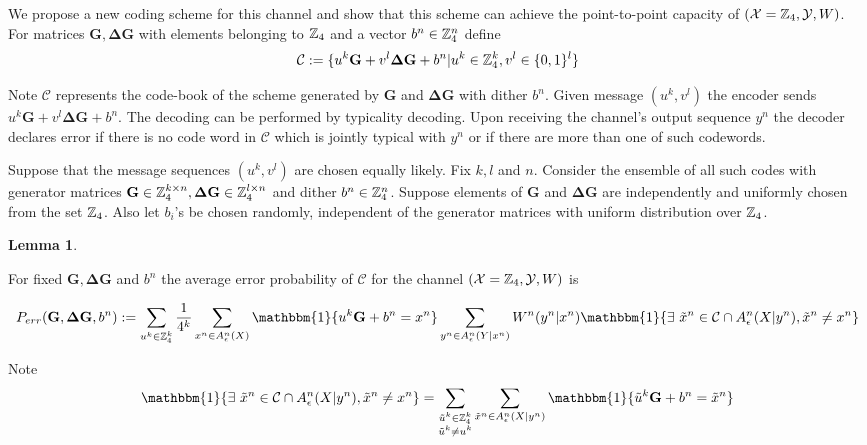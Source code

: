 \documentclass[11pt]{article}
\theoremstyle{plain}
\newtheorem{lem}{Lemma}
\theoremstyle{definition}
\theoremstyle{remark}
\begin{document}
We propose a new coding scheme for this channel and show that this scheme can achieve the point-to-point capacity of $(\mathcal{X}=\mathbb{Z}_4,\mathcal{Y}, W)$. 
For matrices $\mathbf{G}, \mathbf{\Delta G}$ with elements belonging to $\mathbb{Z}_4$ and a vector $b^n\in \mathbb{Z}_4^n$ define
\begin{equation}
\mathcal{C}:=\{ u^k\mathbf{G}+v^l\mathbf{\Delta G}+b^n|u^k\in \mathbb{Z}_4^k, v^l\in \{0,1\}^l\}
\end{equation}

Note $\mathcal{C}$ represents the code-book of the scheme generated by $\mathbf{G}$ and $\mathbf{\Delta G}$ with dither $b^n$. Given message $(u^k,v^l)$ the encoder sends $u^k\mathbf{G}+v^l\mathbf{\Delta G}+b^n$. The decoding can be performed by typicality decoding. Upon receiving the channel's output sequence $y^n$ the decoder declares error if there is no code word in $\mathcal{C}$ which is jointly typical with $y^n$ or if there are more than one of such codewords.

Suppose that the message sequences $(u^k,v^l)$ are chosen equally likely. Fix $k,l$ and $n$. Consider the ensemble of all such codes with generator matrices $\mathbf{G}\in \mathbb{Z}_4^{k \times n},\mathbf{\Delta G}\in \mathbb{Z}_4^{l \times n} $ and dither $b^n\in \mathbb{Z}_4^n$. Suppose elements of $\mathbf{G}$ and $\mathbf{\Delta G}$  are independently and uniformly chosen from the set $\mathbb{Z}_4$. Also let $b_i$'s be chosen randomly, independent of the generator matrices with uniform distribution over $\mathbb{Z}_4$. 


\begin{lem}
\end{lem}




For fixed $\mathbf{G}, \mathbf{\Delta G}$ and $b^n$ the average error probability of $\mathcal{C}$ for the channel $(\mathcal{X}=\mathbb{Z}_4, \mathcal{Y},W)$ is

\begin{align*}
P_{err}(\mathbf{G},\mathbf{\Delta G},b^n):=\sum_{u^k\in \ZZ_4^k}\frac{1}{4^k} \sum_{x^n\in A_\epsilon^n(X)} \mathbbm{1}\{ u^k \mathbf{G}+b^n=x^n\} \sum_{y^n\in A_\epsilon^n(Y|x^n)}  W^n(y^n|x^n) \mathbbm{1}\{ \exists ~ \tilde{x}^n\in \mathcal{C} \cap A_\epsilon^n(X|y^n), \tilde{x}^n\neq x^n \}
\end{align*}

Note
\begin{align*}
\mathbbm{1}\{ \exists ~ \tilde{x}^n\in \mathcal{C} \cap A_\epsilon^n(X|y^n), \tilde{x}^n\neq x^n \}=\sum_{\substack{\tilde{u}^k \in \ZZ_4^k \\\tilde{u}^k\neq u^k}}\sum_{\tilde{x}^n\in A_\epsilon^n(X|y^n)}\mathbbm{1}\{ \tilde{u}^k\mathbf{G}+b^n=\tilde{x}^n\}
\end{align*}
\end{document}
